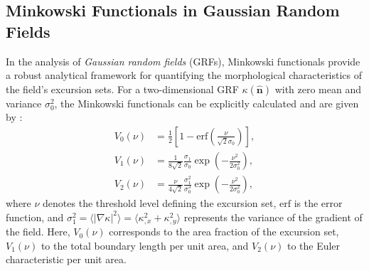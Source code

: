 \subsection{Minkowski Functionals in Gaussian Random Fields}
In the analysis of \emph{Gaussian random fields} (GRFs), Minkowski functionals provide a robust analytical framework for quantifying the morphological characteristics of the field's excursion sets. For a two-dimensional GRF \(\kappa(\hat{\mathbf{n}})\) with zero mean and variance \(\sigma_0^2\), the Minkowski functionals can be explicitly calculated and are given by \citep{2010PhRvD..81h3505M}:
\begin{align}
    V_0(\nu) &= \frac{1}{2}\left[1 - \mathrm{erf}\left( \frac{\nu}{\sqrt{2}\sigma_0} \right) \right], \label{eq:V0_GRF} \\
    V_1(\nu) &= \frac{1}{8\sqrt{2}} \frac{\sigma_1}{\sigma_0} \exp\left( -\frac{\nu^2}{2\sigma_0^2} \right), \label{eq:V1_GRF} \\
    V_2(\nu) &= \frac{\nu}{4\sqrt{2}} \frac{\sigma_1^2}{\sigma_0^3} \exp\left( -\frac{\nu^2}{2\sigma_0^2} \right), \label{eq:V2_GRF}
\end{align}
where \(\nu\) denotes the threshold level defining the excursion set, \(\mathrm{erf}\) is the error function, and \(\sigma_1^2 = \langle |\nabla \kappa|^2 \rangle = \langle \kappa_{, x}^2 + \kappa_{, y}^2 \rangle\) represents the variance of the gradient of the field. Here, \(V_0(\nu)\) corresponds to the area fraction of the excursion set, \(V_1(\nu)\) to the total boundary length per unit area, and \(V_2(\nu)\) to the Euler characteristic per unit area.

